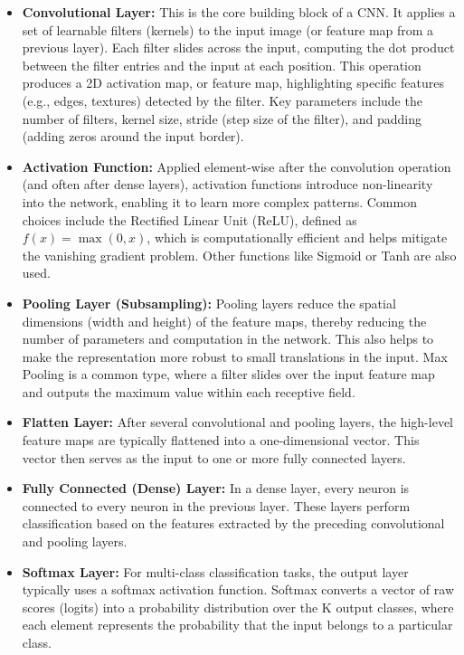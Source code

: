 \documentclass[conference]{IEEEtran}
\begin{document}
\begin{itemize}
    \item \textbf{Convolutional Layer:} This is the core building block of a CNN. It applies a set of learnable filters (kernels) to the input image (or feature map from a previous layer). Each filter slides across the input, computing the dot product between the filter entries and the input at each position. This operation produces a 2D activation map, or feature map, highlighting specific features (e.g., edges, textures) detected by the filter. Key parameters include the number of filters, kernel size, stride (step size of the filter), and padding (adding zeros around the input border).

    \item \textbf{Activation Function:} Applied element-wise after the convolution operation (and often after dense layers), activation functions introduce non-linearity into the network, enabling it to learn more complex patterns. Common choices include the Rectified Linear Unit (ReLU), defined as $f(x) = \max(0, x)$, which is computationally efficient and helps mitigate the vanishing gradient problem. Other functions like Sigmoid or Tanh are also used.

    \item \textbf{Pooling Layer (Subsampling):} Pooling layers reduce the spatial dimensions (width and height) of the feature maps, thereby reducing the number of parameters and computation in the network. This also helps to make the representation more robust to small translations in the input. Max Pooling is a common type, where a filter slides over the input feature map and outputs the maximum value within each receptive field.

    \item \textbf{Flatten Layer:} After several convolutional and pooling layers, the high-level feature maps are typically flattened into a one-dimensional vector. This vector then serves as the input to one or more fully connected layers.

    \item \textbf{Fully Connected (Dense) Layer:} In a dense layer, every neuron is connected to every neuron in the previous layer. These layers perform classification based on the features extracted by the preceding convolutional and pooling layers.

    \item \textbf{Softmax Layer:} For multi-class classification tasks, the output layer typically uses a softmax activation function. Softmax converts a vector of raw scores (logits) into a probability distribution over the K output classes, where each element represents the probability that the input belongs to a particular class.
\end{itemize}
\end{document}
